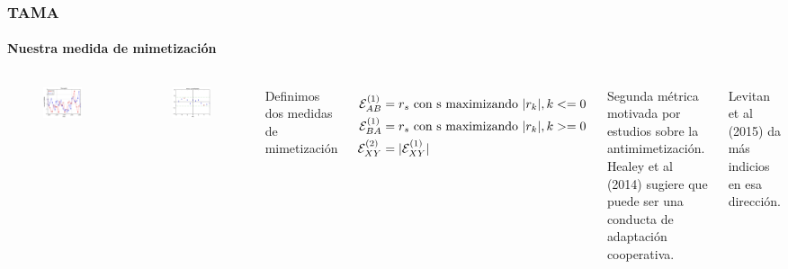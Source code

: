 \begin{frame}
\frametitle{TAMA}
\framesubtitle{Nuestra medida de mimetización}

  \begin{columns}
    \begin{figure}[t]
      \includegraphics[scale=0.28]{images/time_plot.png}
    \end{figure}

    \begin{figure}[t]
      \includegraphics[scale=0.28]{images/cross_correlogram_2.png}
    \end{figure}


    Definimos dos medidas de mimetización

    \begin{align*}
      \mathcal{E}_{AB}^{(1)} &= r_s \text{ con s maximizando } |r_k|,  k <= 0  \\
      \mathcal{E}_{BA}^{(1)} &= r_s \text{ con s maximizando } |r_k|,  k >= 0  \\
      \mathcal{E}_{XY}^{(2)} &= |\mathcal{E}_{XY}^{(1)}|
    \end{align*}

    Segunda métrica motivada por estudios sobre la antimimetización. Healey et al (2014) sugiere que puede ser una conducta de adaptación cooperativa.

    Levitan et al (2015) da más indicios en esa dirección.
  \end{columns}
\end{frame}


